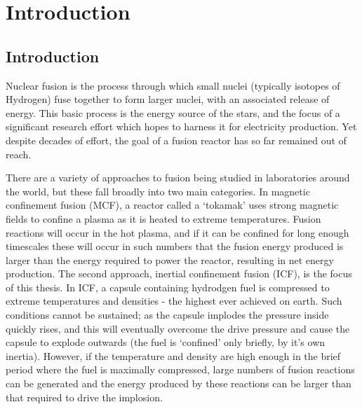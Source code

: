 

\chapter{Introduction} 

\minitoc


\section{Introduction}
Nuclear fusion is the process through which small nuclei (typically isotopes of Hydrogen) fuse together to form larger nuclei, with an associated release of energy. This basic process is the energy source of the stars, and the focus of a significant research effort which hopes to harness it for electricity production. Yet despite decades of effort, the goal of a fusion reactor has so far remained out of reach.

There are a variety of approaches to fusion being studied in laboratories around the world, but these fall broadly into two main categories. In magnetic confinement fusion (MCF), a reactor called a `tokamak' uses strong magnetic fields to confine a plasma as it is heated to extreme temperatures. Fusion reactions will occur in the hot plasma, and if it can be confined for long enough timescales these will occur in such numbers that the fusion energy produced is larger than the energy required to power the reactor, resulting in net energy production. The second approach, inertial confinement fusion (ICF), is the focus of this thesis. In ICF, a capsule containing hydrodgen fuel is compressed to extreme temperatures and densities - the highest ever achieved on earth. Such conditions cannot be sustained; as the capsule implodes the pressure inside quickly rises, and this will eventually overcome the drive pressure and cause the capsule to explode outwards (the fuel is `confined' only briefly, by it's own inertia). However, if the temperature and density are high enough in the brief period where the fuel is maximally compressed, large numbers of fusion reactions can be generated and the energy produced by these reactions can be larger than that required to drive the implosion. 

